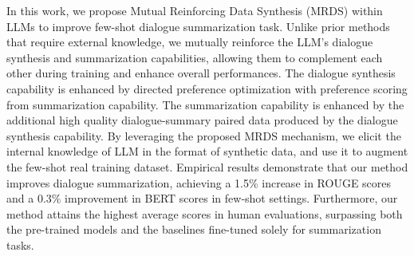 In this work, we propose Mutual Reinforcing Data Synthesis (MRDS) within LLMs to improve few-shot dialogue summarization task.
Unlike prior methods that require external knowledge, we mutually reinforce the LLM’s dialogue synthesis and summarization capabilities, allowing them to complement each other during training and enhance overall performances.
The dialogue synthesis capability is enhanced by directed preference optimization with preference scoring from summarization capability.
The summarization capability is enhanced by the additional high quality dialogue-summary paired data produced by the dialogue synthesis capability.
%
By leveraging the proposed MRDS mechanism, we elicit the internal knowledge of LLM in the format of synthetic data, and use it to augment the few-shot real training dataset. 
%
Empirical results demonstrate that our method improves dialogue summarization, achieving a 1.5\% increase in ROUGE scores and a 0.3\% improvement in BERT scores in few-shot settings. 
Furthermore, our method attains the highest average scores in human evaluations, surpassing both the pre-trained models and the baselines fine-tuned solely for summarization tasks.
%
